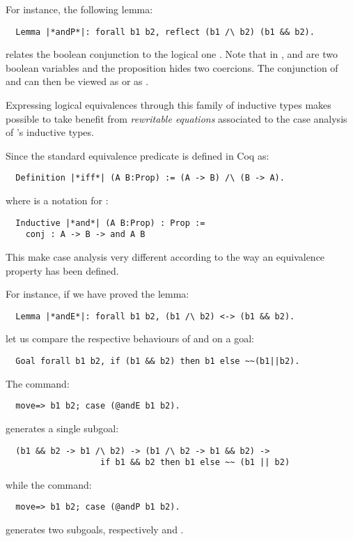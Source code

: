 For instance, the following lemma:
\begin{lstlisting}
  Lemma |*andP*|: forall b1 b2, reflect (b1 /\ b2) (b1 && b2).
\end{lstlisting}
relates the boolean conjunction \C{&&} to
the logical one \C{/\\}.
Note that in ,  and  are two boolean variables and
the proposition  hides two coercions.
The conjunction of  and  can then be viewed
as   or as .


Expressing logical equivalences through this family of inductive types
makes possible to take benefit from \emph{rewritable equations}
associated to the case analysis of \Coq{}'s inductive types.

Since the standard equivalence predicate is defined in Coq{} as:
\begin{lstlisting}
  Definition |*iff*| (A B:Prop) := (A -> B) /\ (B -> A).
\end{lstlisting}
where \C{/\\} is a notation for :
\begin{lstlisting}
  Inductive |*and*| (A B:Prop) : Prop :=
    conj : A -> B -> and A B
\end{lstlisting}

This make case analysis very different according to the way an
equivalence property has been defined.


For instance, if we have proved the lemma:
\begin{lstlisting}
  Lemma |*andE*|: forall b1 b2, (b1 /\ b2) <-> (b1 && b2).
\end{lstlisting}
let us compare the respective behaviours of  and  on a
goal:
\begin{lstlisting}
  Goal forall b1 b2, if (b1 && b2) then b1 else ~~(b1||b2).
\end{lstlisting}

The command:
\begin{lstlisting}
  move=> b1 b2; case (@andE b1 b2).
\end{lstlisting}
generates a single subgoal:
\begin{lstlisting}
  (b1 && b2 -> b1 /\ b2) -> (b1 /\ b2 -> b1 && b2) ->
                   if b1 && b2 then b1 else ~~ (b1 || b2)
\end{lstlisting}

while the command:
\begin{lstlisting}
  move=> b1 b2; case (@andP b1 b2).
\end{lstlisting}
generates two subgoals, respectively  and
.



